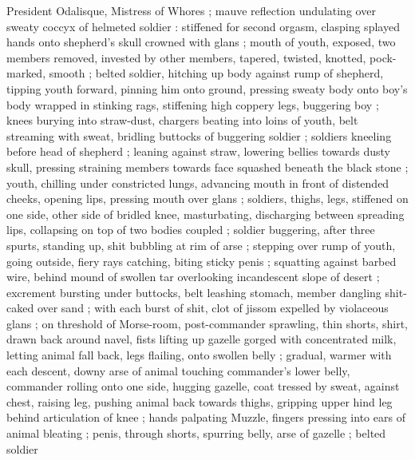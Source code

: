 {President Odalisque, Mistress of Whores{\thd}} ; mauve reflection undulating over sweaty coccyx of helmeted soldier : stiffened for second orgasm, clasping splayed hands onto shepherd's skull crowned with glans ; mouth of youth, exposed, two members removed, invested by other members, tapered, twisted, knotted, pock-marked, smooth ; belted soldier, hitching up body against rump of shepherd, tipping youth forward, pinning him onto ground, pressing sweaty body onto boy's body wrapped in stinking rags, stiffening high coppery legs, buggering boy ; knees burying into straw-dust, chargers beating into loins of youth, belt streaming with sweat, bridling buttocks of buggering soldier ; soldiers kneeling before head of shepherd ; leaning against straw, lowering bellies towards dusty skull, pressing straining members towards face squashed beneath the black stone ; youth, chilling under constricted lungs, advancing mouth in front of distended cheeks, opening lips, pressing mouth over glans ; soldiers, thighs, legs, stiffened on one side, other side of bridled knee, masturbating, discharging between spreading lips, collapsing on top of two bodies coupled ; soldier buggering, after three spurts, standing up, shit bubbling at rim of arse ; stepping over rump of youth, going outside, fiery rays catching, biting sticky penis ; squatting against barbed wire, behind mound of swollen tar overlooking incandescent slope of desert ; excrement bursting under buttocks, belt leashing stomach, member dangling shit-caked over sand ; with each burst of shit, clot of jissom expelled by violaceous glans ; on threshold of Morse-room, post-commander sprawling, thin shorts, shirt, drawn back around navel, fists lifting up gazelle gorged with concentrated milk, letting animal fall back, legs flailing, onto swollen belly ; gradual, warmer with each descent, downy arse of animal touching commander's lower belly, commander rolling onto one side, hugging gazelle, coat tressed by sweat, against chest, raising leg, pushing animal back towards thighs, gripping upper hind leg behind articulation of knee ; hands palpating Muzzle, fingers pressing into ears of animal bleating ; penis, through shorts, spurring belly, arse of gazelle ; belted soldier 
